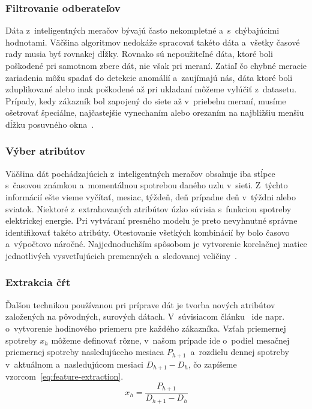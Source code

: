 \documentclass[a4paper,twoside,slovak,12pt,appendix]{article}
\begin{document}
\subsubsection{Filtrovanie odberateľov}
Dáta z~inteligentných meračov bývajú často nekompletné a~s~chýbajúcimi
hodnotami. Väčšina algoritmov nedokáže spracovať takéto dáta a~všetky časové
rady musia byť rovnakej dĺžky. Rovnako sú nepoužiteľné dáta, ktoré boli
poškodené pri samotnom zbere dát, nie však pri meraní. Zatiaľ čo chybné meracie
zariadenia môžu spadať do detekcie anomálií a~zaujímajú nás, dáta ktoré boli
zduplikované alebo inak poškodené až pri ukladaní môžeme vylúčiť z~datasetu.
Prípady, kedy zákazník bol zapojený do siete až v~priebehu meraní, musíme
ošetrovať špeciálne, najčastejšie vynechaním alebo orezaním na najbližšiu menšiu
dĺžku posuvného okna~\cite{Nagi2008}.

\subsubsection{Výber atribútov}
Väčšina dát pochádzajúcich z~inteligentných meračov obsahuje iba stĺpce
s~časovou známkou a~momentálnou spotrebou daného uzlu v~sieti. Z~týchto
informácií ešte vieme vyčítať, mesiac, týždeň, deň prípadne deň v~týždni alebo
sviatok. Niektoré z~extrahovaných atribútov úzko súvisia s~funkciou spotreby
elektrickej energie. Pri vytváraní presného modelu je preto nevyhnutné správne
identifikovať takéto atribúty. Otestovanie všetkých kombinácií by bolo časovo
a~výpočtovo náročné. Najjednoduchším spôsobom je vytvorenie korelačnej matice
jednotlivých vysvetľujúcich premenných a~sledovanej veličiny~\cite{Cody2015}.

\subsubsection{Extrakcia čŕt}
Ďalšou technikou používanou pri príprave dát je tvorba nových atribútov
založených na pôvodných, surových dátach. V~súvisiacom článku~\cite{Nagi2008}
ide napr. o~vytvorenie hodinového priemeru pre každého zákazníka. Vzťah
priemernej spotreby $x_h$ môžeme definovať rôzne, v~našom prípade ide o~podiel
mesačnej priemernej spotreby nasledujúceho mesiaca $P_{h+1}$~a~rozdielu dennej
spotreby v~aktuálnom a~nasledujúcom mesiaci $D_{h+1} - D_{h}$, čo zapíšeme
vzorcom~\ref{eq:feature-extraction}.
\begin{equation}
	\label{eq:feature-extraction}
  x_h = \frac{P_{h+1}}{D_{h+1} - D_{h}}
\end{equation}
\end{document}
